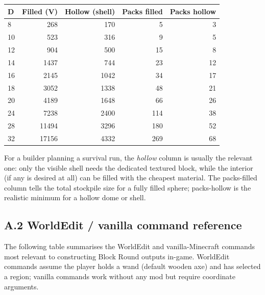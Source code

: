 \documentclass[12pt,a4paper]{scrartcl}
\begin{document}
\vspace{0.4em}
\begin{center}
\begin{tabular}{@{}lrrrr@{}}
\toprule
\textbf{D} & \textbf{Filled (V)} & \textbf{Hollow (shell)} & \textbf{Packs filled} & \textbf{Packs hollow} \\
\midrule
8   &   268 &   170 &  5  &  3  \\
10  &   523 &   316 &  9  &  5  \\
12  &   904 &   500 & 15  &  8  \\
14  &  1437 &   744 & 23  & 12  \\
16  &  2145 &  1042 & 34  & 17  \\
18  &  3052 &  1338 & 48  & 21  \\
20  &  4189 &  1648 & 66  & 26  \\
24  &  7238 &  2400 & 114 & 38  \\
28  & 11494 &  3296 & 180 & 52  \\
32  & 17156 &  4332 & 269 & 68  \\
\bottomrule
\end{tabular}
\end{center}

For a builder planning a survival run, the \emph{hollow} column is usually the relevant one: only the visible shell needs the dedicated textured block, while the interior (if any is desired at all) can be filled with the cheapest material. The packs-filled column tells the total stockpile size for a fully filled sphere; packs-hollow is the realistic minimum for a hollow dome or shell.

\subsection*{A.2 WorldEdit / vanilla command reference}
The following table summarises the WorldEdit and vanilla-Minecraft commands most relevant to constructing Block Round outputs in-game. WorldEdit commands assume the player holds a wand (default wooden axe) and has selected a region; vanilla commands work without any mod but require coordinate arguments.
\end{document}
